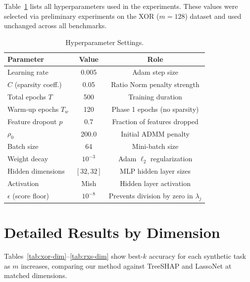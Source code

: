 \documentclass{uai2026} %
\theoremstyle{definition}
\theoremstyle{remark}
\begin{document}
Table~\ref{tab:hparams} lists all hyperparameters used in the experiments.
These values were selected via preliminary experiments on the XOR ($m{=}128$) dataset and used unchanged across all benchmarks.

\begin{table}[h]
    \centering
    \caption{Hyperparameter Settings.}\label{tab:hparams}
    \begin{tabular}{lcc}
        \toprule
        \textbf{Parameter} & \textbf{Value} & \textbf{Role} \\
        \midrule
        Learning rate           & 0.005   & Adam step size \\
        $C$ (sparsity coeff.)   & 0.05    & Ratio Norm penalty strength \\
        Total epochs $T$        & 500     & Training duration \\
        Warm-up epochs $T_w$    & 120     & Phase 1 epochs (no sparsity) \\
        Feature dropout $p$     & 0.7     & Fraction of features dropped \\
        $\rho_0$                & 200.0   & Initial ADMM penalty \\
        Batch size              & 64      & Mini-batch size \\
        Weight decay            & $10^{-3}$ & Adam $\ell_2$ regularization \\
        Hidden dimensions       & $[32, 32]$ & MLP hidden layer sizes \\
        Activation              & Mish    & Hidden layer activation \\
        $\epsilon$ (score floor) & $10^{-8}$ & Prevents division by zero in $\lambda_j$ \\
        \bottomrule
    \end{tabular}
\end{table}

\section{Detailed Results by Dimension}\label{app:bydim}

Tables~\ref{tab:xor-dim}--\ref{tab:rxs-dim} show best-$k$ accuracy for each synthetic task as $m$ increases, comparing our method against TreeSHAP and LassoNet at matched dimensions.
\end{document}
